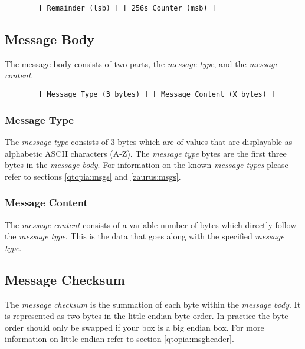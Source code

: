         \begin{verbatim}
        [ Remainder (lsb) ] [ 256s Counter (msb) ]
        \end{verbatim}

        \subsection{Message Body}

        The message body consists of two parts, the \emph{message type},
        and the \emph{message content}.

        \begin{verbatim}
        [ Message Type (3 bytes) ] [ Message Content (X bytes) ]
        \end{verbatim}

            \subsubsection{Message Type}
            \label{msgtype}
            The \emph{message type}
            consists of 3 bytes which are of values that are displayable
            as alphabetic ASCII characters (A-Z). The \emph{message type}
            bytes are the first three bytes in the \emph{message body}.
            For information on the known \emph{message types} please
            refer to sections \ref{qtopia:msgs} and \ref{zaurus:msgs}.

            \subsubsection{Message Content}
            The \emph{message content}
            consists of a variable number of bytes which directly
            follow the \emph{message type}. This is the data that goes
            along with the specified \emph{message type}.
            
        \subsection{Message Checksum}

        The \emph{message checksum} is the summation of each byte within
        the \emph{message body}. It is represented as two bytes in the
        little endian byte order. In practice the byte order should only be
        swapped if your box is a big endian box.
        For more information on little endian refer to section
        \ref{qtopia:msgheader}.

